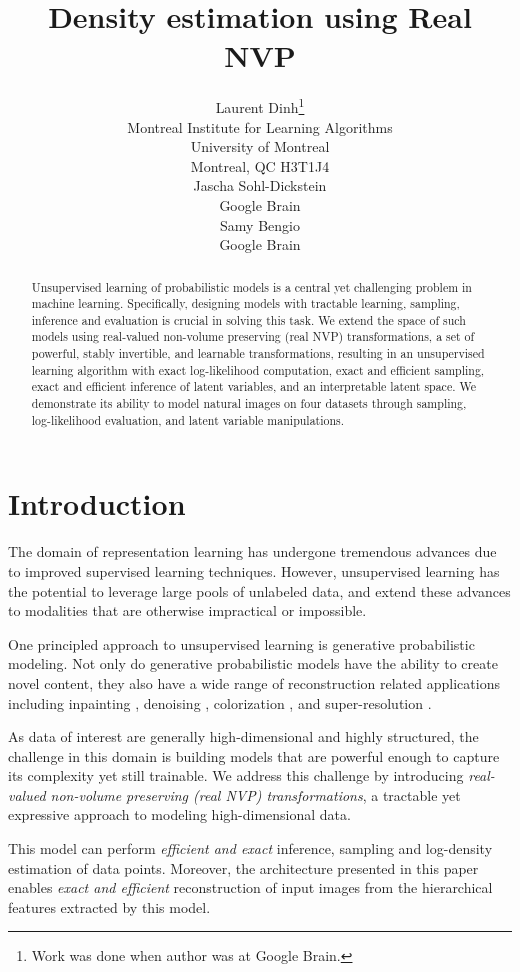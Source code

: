 \documentclass{article}
\title{Density estimation using Real NVP}
\author{
  Laurent Dinh\thanks{Work was done when author was at Google Brain.} \\
  Montreal Institute for Learning Algorithms\\
  University of Montreal\\
  Montreal, QC H3T1J4\\
  \AND
  Jascha Sohl-Dickstein\\
  Google Brain \\
  \And
  Samy Bengio\\
  Google Brain \\
}
\begin{document}
\maketitle

\begin{abstract}
Unsupervised learning of probabilistic models is a central yet challenging problem in machine learning.
Specifically, designing models with tractable learning, sampling,
  inference and evaluation is crucial in solving this task. We extend the space
  of such models using real-valued non-volume preserving (real NVP)
  transformations, a set of powerful, stably invertible, and learnable transformations,
  resulting in an unsupervised learning algorithm with exact log-likelihood computation,
  exact and efficient sampling, exact and efficient inference of latent variables,
  and an interpretable latent space. We
  demonstrate its ability to model natural images on four datasets through
  sampling, log-likelihood evaluation, and latent variable
  manipulations.
\end{abstract}
\section{Introduction}
The domain of representation learning has undergone tremendous advances due to improved supervised learning techniques. However, unsupervised learning has the potential to leverage large pools of unlabeled data, and extend these advances to modalities that are otherwise impractical or impossible.

One principled approach to unsupervised learning is generative probabilistic modeling. Not only do generative probabilistic models have the ability to create novel content, they also have a wide range of reconstruction related applications including inpainting \citep{theis2015generative, oord2016pixel, DBLP:conf/icml/Sohl-DicksteinW15}, denoising \citep{balle2015density}, colorization \citep{zhang2016colorful}, and super-resolution \citep{bruna2015super}.

As data of interest are generally high-dimensional and highly structured, the challenge in this domain is building models that are powerful enough to capture its complexity yet still trainable.
We address this challenge by introducing \emph{real-valued non-volume preserving (real NVP) transformations}, a tractable yet expressive approach to modeling high-dimensional data.

This model can perform {\em efficient and exact} inference, sampling and log-density estimation of data points. Moreover, the architecture presented in this paper enables {\em exact and efficient} reconstruction of input images from the hierarchical features extracted by this model.
\end{document}

